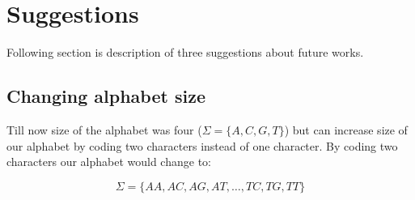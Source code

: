 \section{Suggestions}

Following section is description of three suggestions about future works.

\subsection{Changing alphabet size}
Till now size of the alphabet was four ($\Sigma = \{A,C,G,T\}$) but can increase size of our alphabet by coding two characters instead of one character. By coding two characters our alphabet would change to:

\begin{equation}
\nonumber
\Sigma = \{ AA, AC, AG, AT, \dots, TC, TG, TT \}
\end{equation}
  
  